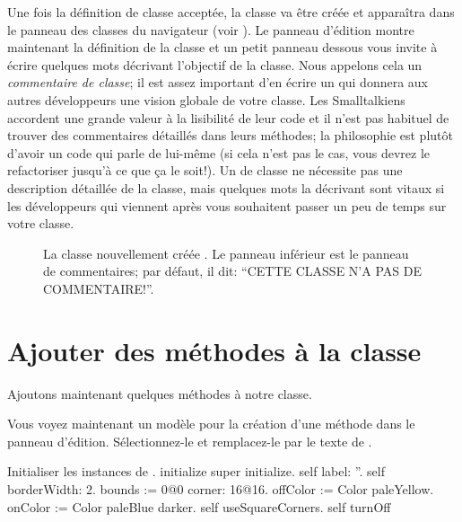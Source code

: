 \documentclass[a4paper,10pt,twoside]{book}
\begin{document}
Une fois la définition de classe acceptée, la classe va être créée et
apparaîtra dans le panneau des classes du navigateur (voir ).
Le panneau d'édition montre maintenant la définition de la classe et
un petit panneau dessous vous invite à écrire quelques mots décrivant
l'objectif de la classe. Nous appelons cela un \emph{commentaire de
  classe}; il est assez important d'en écrire un qui donnera aux
autres développeurs une vision 
globale de votre classe.
Les Smalltalkiens accordent une grande valeur à la lisibilité de leur
code et il n'est pas habituel de trouver des commentaires détaillés
dans leurs méthodes; la philosophie est plutôt d'avoir un code qui
parle de lui-même (si cela n'est pas le cas, vous devrez le
refactoriser jusqu'à ce que ça le soit!). 
Un  de classe ne nécessite pas une
description détaillée de la classe, mais quelques mots la décrivant
sont vitaux si les développeurs qui viennent après vous souhaitent
passer un peu de temps sur votre classe.


\begin{figure}[h!t]
\caption{La classe nouvellement créée . Le panneau
  inférieur est le panneau de commentaires; par défaut, il dit:
  ``CETTE CLASSE N'A PAS DE COMMENTAIRE!''.
}
\end{figure}

\section{Ajouter des méthodes à la classe}

Ajoutons maintenant quelques méthodes à notre classe.

Vous voyez maintenant un modèle pour la création d'une méthode dans le panneau d'édition.
Sélectionnez-le et remplacez-le par le texte de .

\begin{numMethod}[scbecellinitialize]{Initialiser les instances de .}
initialize
   super initialize.
   self label: ''.
   self borderWidth: 2.
   bounds := 0@0 corner: 16@16.
   offColor := Color paleYellow.
   onColor := Color paleBlue darker.
   self useSquareCorners.
   self turnOff
\end{numMethod}
\end{document}
